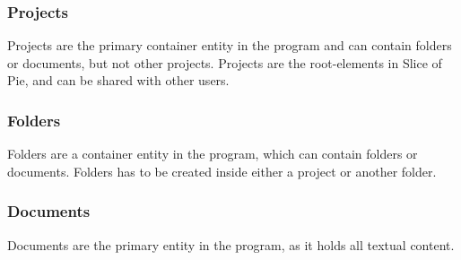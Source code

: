 \subsubsection{Projects}
Projects are the primary container entity in the program and can contain folders or documents, but not other projects.
Projects are the root-elements in Slice of Pie, and can be shared with other users.

\subsubsection{Folders}
Folders are a container entity in the program, which can contain folders or documents. Folders has to be created inside either a project or another folder.

\subsubsection{Documents}
Documents are the primary entity in the program, as it holds all textual content.




